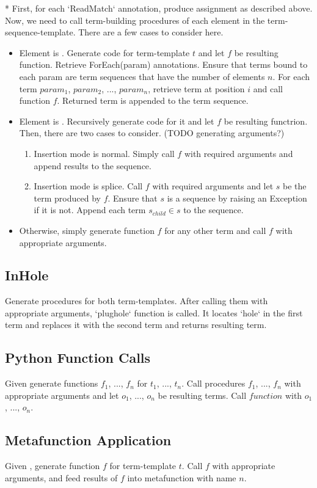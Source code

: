 * First, for each `ReadMatch` annotation, produce assignment as described above. Now, we need to call term-building procedures of each element in the term-sequence-template. There are a few cases to consider here. 

\begin{itemize}
	\item
	Element is \TermRepeat. Generate code for term-template $t$ and let $f$ be resulting function.  Retrieve ForEach(param) annotations. Ensure that terms bound to each param are term sequences that have the number of elements $n$. 
	For each term $param_1$, $param_2$, ..., $param_n$, retrieve term at position $i$ and call function $f$. Returned term is appended to the term sequence.
	\item
	Element is \PythonCall. Recursively generate code for it and let $f$ be resulting functrion. Then, there are two cases to consider. (TODO generating arguments?)
	\begin{enumerate}
	\item Insertion mode is normal. Simply call $f$ with required arguments and append results to the sequence.
	\item Insertion mode is splice. Call $f$ with required arguments and let $s$ be the term produced by $f$. Ensure that $s$ is a sequence by raising an Exception if it is not. Append each term $s_{child} \in s$ to the sequence.
	\end{enumerate}
	\item Otherwise, simply generate function $f$ for any other term and call $f$ with appropriate arguments. 
	\end{itemize}


\subsection{InHole}
Generate procedures for both term-templates. After calling them with appropriate arguments, `plughole` function is called. It locates `hole` in the first term and replaces it with the second term and returns resulting term.

\subsection{Python Function Calls}
Given \PythonCall generate functions $f_1$, ..., $f_n$ for $t_1$, ..., $t_n$. Call procedures $f_1$, ..., $f_n$ with appropriate arguments and let $o_1$, ..., $o_n$ be resulting terms. Call $function$ with $o_1$, ..., $o_n$.

\subsection{Metafunction Application}
Given \ApplyMetafunction, generate function $f$ for term-template $t$. Call $f$ with appropriate arguments, and feed results of $f$ into metafunction with name $n$.


